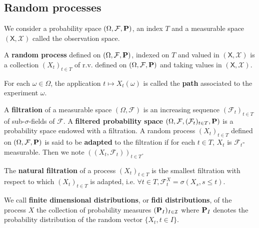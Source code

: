 \subsection{Random processes}

	We consider a probability space $(\Omega, \mathcal{F}, \mathbf{P})$, an index $T$ and a measurable space $(\mathsf{X}, \mathcal{X})$ called the observation space.

	\begin{defn}
		A \textbf{random process} defined on $(\Omega, \mathcal{F}, \mathbf{P})$, indexed on $T$ and valued in $(\mathsf{X}, \mathcal{X})$ is a collection $(X_t)_{t \in T}$ of r.v. defined on $(\Omega, \mathcal{F}, \mathbf{P})$ and taking values in $(\mathsf{X}, \mathcal{X})$.
	\end{defn}

	\begin{defn}
		For each $\omega \in \Omega$, the application $t \mapsto X_t(\omega)$ is called the \textbf{path} associated to the experiment $\omega$.
	\end{defn}

	\begin{defn}
		A \textbf{filtration} of a measurable space $(\Omega, \mathcal{F})$ is an increasing sequence $(\mathcal{F}_t)_{t \in T}$ of sub-$\sigma$-fields of $\mathcal{F}$.
		A \textbf{filtered probability space} $(\Omega, \mathcal{F}, (\mathcal{F}_t)_{t \in T}, \mathbf{P})$ is a probability space endowed with a filtration.
		A random process $(X_t)_{t \in T}$ defined on $(\Omega, \mathcal{F}, \mathbf{P})$ is said to be \textbf{adapted} to the filtration if for each $t \in T$, $X_t$ is $\mathcal{F}_t$-measurable.
		Then we note $((X_t, \mathcal{F}_t))_{t \in T}$.
	\end{defn}

	\begin{defn}
		The \textbf{natural filtration} of a process $(X_t)_{t \in T}$ is the smallest filtration with respect to which $(X_t)_{t \in T}$ is adapted, i.e. $\forall t \in T, \mathcal{F}_t^X = \sigma(X_s, s \leq t)$.
	\end{defn}

	\begin{defn}
		We call \textbf{finite dimensional distributions}, or \textbf{fidi distributions}, of the process $X$ the collection of probability measures $(\mathbf{P}_I)_{I \in \mathcal{I}}$ where $\mathbf{P}_I$ denotes the probability distribution of the random vector $\{ X_t, t \in I \}$.
	\end{defn}


